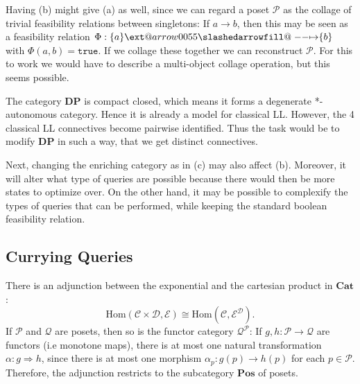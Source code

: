 \documentclass[12pt]{article}
\makeatletter
\theoremstyle{definition}
\theoremstyle{plain}
\theoremstyle{plain}
\theoremstyle{plain}
\theoremstyle{plain}
\theoremstyle{remark}
\theoremstyle{remark}
\newcommand{\mc}[1]{\mathcal{#1}}
\newcommand{\Hom}{\text{Hom}}
\def\slashedarrowfill@#1#2#3#4#5{%
	$\m@th\thickmuskip0mu\medmuskip\thickmuskip\thinmuskip\thickmuskip
	\relax#5#1\mkern-7mu%
	\cleaders\hbox{$#5\mkern-2mu#2\mkern-2mu$}\hfill
	\mathclap{#3}\mathclap{#2}%
	\cleaders\hbox{$#5\mkern-2mu#2\mkern-2mu$}\hfill
	\mkern-7mu#4$%
}
\def\rightslashedarrowfill@{%
	\slashedarrowfill@\relbar\relbar\mapstochar\rightarrow}
\newcommand\xslashedrightarrow[2][]{%
	\ext@arrow 0055{\rightslashedarrowfill@}{#1}{#2}}
\makeatother
\begin{document}
Having (b) might give (a) as well, since we can regard a poset $\mc{P}$ as the collage of trivial feasibility relations between singletons: If $a \rightarrow b$, then this may be seen as a feasibility relation $\Phi: \{a\} \xslashedrightarrow{} \{b\}$ with $\Phi(a,b) = \texttt{true}$. If we collage these together we can reconstruct $\mc{P}$. For this to work we would have to describe a multi-object collage operation, but this seems possible.

The category $\mathbf{DP}$ is compact closed, which means it forms a degenerate *-autonomous category. Hence it is already a model for classical LL. However, the 4 classical LL connectives become pairwise identified. Thus the task would be to modify $\mathbf{DP}$ in such a way, that we get distinct connectives.

Next, changing the enriching category as in (c) may also affect (b). Moreover, it will alter what type of queries are possible because there would then be more states to optimize over. On the other hand, it may be possible to complexify the types of queries that can be performed, while keeping the standard boolean feasibility relation. 

\subsection{Currying Queries}

There is an adjunction between the exponential and the cartesian product in $\mathbf{Cat}$:
$$ \Hom(\mc{C} \times \mc{D}, \mc{E}) \cong \Hom(\mc{C}, \mc{E}^\mc{D}). $$
If $\mc{P}$ and $\mc{Q}$ are posets, then so is the functor category $\mc{Q}^\mc{P}$: If $g, h:\mc{P} \rightarrow \mc{Q}$ are functors (i.e monotone maps), there is at most one natural transformation $\alpha: g \Rightarrow h$, since there is at most one morphism $\alpha_p : g(p) \rightarrow h(p)$ for each $p \in \mc{P}$. Therefore, the adjunction restricts to the subcategory $\mathbf{Pos}$ of posets. \\
\end{document}
